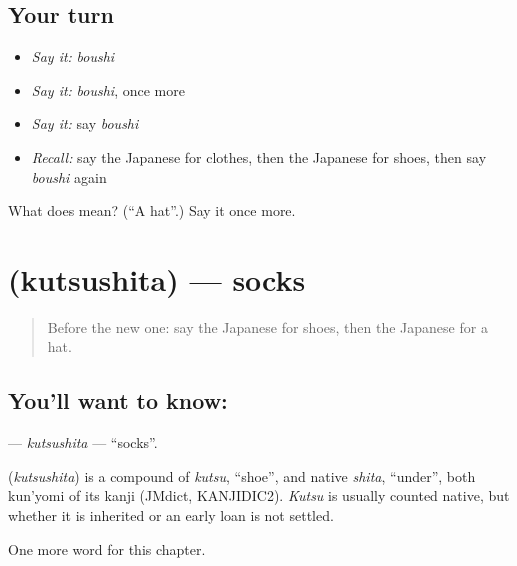 \subsection*{Your turn}
\begin{itemize}
\raggedright
  \item \emph{Say it:} \emph{boushi}
  \item \emph{Say it:} \emph{boushi}, once more
  \item \emph{Say it:} say \emph{boushi}
  \item \emph{Recall:} say the Japanese for clothes, then the Japanese for shoes, then say \emph{boushi} again
\end{itemize}

\begin{tcolorbox}[breakable,colback=teal!4,colframe=teal!35!black,title={Before you move on}]
What does  mean? (\textquotedblleft{}A hat\textquotedblright{}.) Say it once more.
\end{tcolorbox}
\section[\texorpdfstring{\ja{くつした} (kutsushita)}{くつした (kutsushita)}]{ (kutsushita) — socks}

\label{lesson:JA-C59-kutsushita}



\begin{quote}
Before the new one: say the Japanese for shoes, then the Japanese for a hat.
\end{quote}

\subsection*{You'll want to know: }
\textbf{} — \emph{kutsushita} — \textquotedblleft{}socks\textquotedblright{}.

\begin{cousinweb}
\textbf{} (\emph{kutsushita}) is a compound of \emph{kutsu}, \textquotedblleft{}shoe\textquotedblright{}, and native \emph{shita}, \textquotedblleft{}under\textquotedblright{}, both kun'yomi of its kanji (JMdict, KANJIDIC2). \emph{Kutsu} is usually counted native, but whether it is inherited or an early loan is not settled.
\end{cousinweb}

\begin{grammarlens}[title={What you've built}]
One more word for this chapter.
\end{grammarlens}

